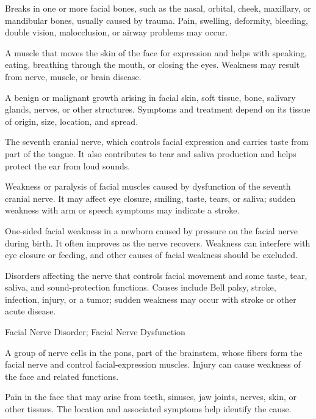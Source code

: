  Breaks in one or more facial bones, such as the nasal, orbital, cheek, maxillary, or mandibular bones, usually caused by trauma. Pain, swelling, deformity, bleeding, double vision, malocclusion, or airway problems may occur.

 A muscle that moves the skin of the face for expression and helps with speaking, eating, breathing through the mouth, or closing the eyes. Weakness may result from nerve, muscle, or brain disease.

 A benign or malignant growth arising in facial skin, soft tissue, bone, salivary glands, nerves, or other structures. Symptoms and treatment depend on its tissue of origin, size, location, and spread.

 The seventh cranial nerve, which controls facial expression and carries taste from part of the tongue. It also contributes to tear and saliva production and helps protect the ear from loud sounds.

 Weakness or paralysis of facial muscles caused by dysfunction of the seventh cranial nerve. It may affect eye closure, smiling, taste, tears, or saliva; sudden weakness with arm or speech symptoms may indicate a stroke.

 One-sided facial weakness in a newborn caused by pressure on the facial nerve during birth. It often improves as the nerve recovers. Weakness can interfere with eye closure or feeding, and other causes of facial weakness should be excluded.

 Disorders affecting the nerve that controls facial movement and some taste, tear, saliva, and sound-protection functions. Causes include Bell palsy, stroke, infection, injury, or a tumor; sudden weakness may occur with stroke or other acute disease.

\synonyms
Facial Nerve Disorder; Facial Nerve Dysfunction

 A group of nerve cells in the pons, part of the brainstem, whose fibers form the facial nerve and control facial-expression muscles. Injury can cause weakness of the face and related functions.

 Pain in the face that may arise from teeth, sinuses, jaw joints, nerves, skin, or other tissues. The location and associated symptoms help identify the cause.

